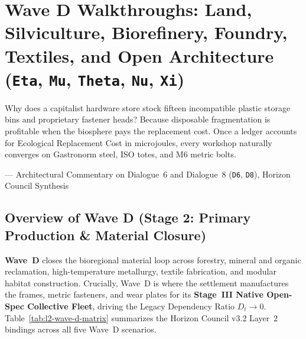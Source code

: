 \chapter{Wave D Walkthroughs: Land, Silviculture, Biorefinery, Foundry, Textiles, and Open Architecture (\texttt{Eta}, \texttt{Mu}, \texttt{Theta}, \texttt{Nu}, \texttt{Xi})}
\label{ch:wave-d-walkthroughs}

\epigraph{Why does a capitalist hardware store stock fifteen incompatible plastic storage bins and proprietary fastener heads? Because disposable fragmentation is profitable when the biosphere pays the replacement cost. Once a ledger accounts for Ecological Replacement Cost in microjoules, every workshop naturally converges on Gastronorm steel, ISO totes, and M6 metric bolts.}{--- Architectural Commentary on Dialogue~6 and Dialogue~8 (\texttt{D6}, \texttt{D8}), Horizon Council Synthesis}

\section{Overview of Wave D (Stage 2: Primary Production \& Material Closure)}
\label{sec:l2-wave-d-overview}

\textbf{Wave~D} closes the bioregional material loop across forestry, mineral and organic reclamation, high-temperature metallurgy, textile fabrication, and modular habitat construction. Crucially, Wave~D is where the settlement manufactures the frames, metric fasteners, and wear plates for its \textbf{Stage~III Native Open-Spec Collective Fleet}, driving the Legacy Dependency Ratio $D_t \to 0$. Table~\ref{tab:l2-wave-d-matrix} summarizes the Horizon Council v3.2 Layer~2 bindings across all five Wave~D scenarios.

